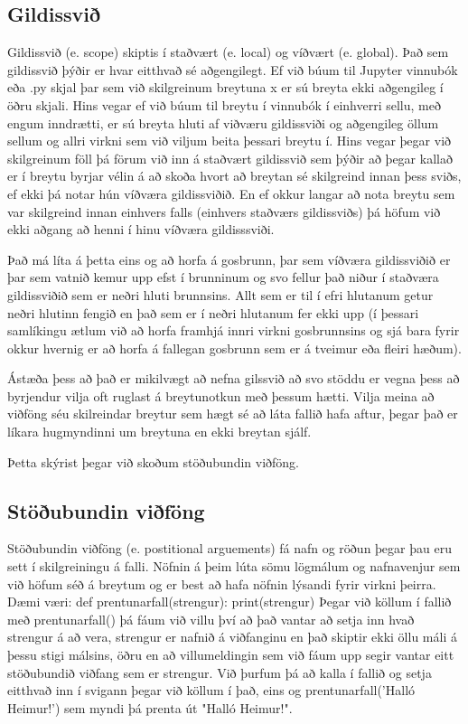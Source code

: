 \subsection{Gildissvið}\label{uk:gildissvið}
Gildissvið (e. scope) skiptis í staðvært (e. local) og víðvært (e. global). 
Það sem gildissvið þýðir er hvar eitthvað sé aðgengilegt.
Ef við búum til Jupyter vinnubók eða .py skjal þar sem við skilgreinum breytuna x er sú breyta ekki aðgengileg í öðru skjali.
Hins vegar ef við búum til breytu í vinnubók í einhverri sellu, með engum inndrætti, er sú breyta hluti af viðværu gildissviði og aðgengileg öllum sellum og allri virkni sem við viljum beita þessari breytu í.
Hins vegar þegar við skilgreinum föll þá förum við inn á staðvært gildissvið sem þýðir að þegar kallað er í breytu byrjar vélin á að skoða hvort að breytan sé skilgreind innan þess sviðs, ef ekki þá notar hún víðværa gildissviðið.
En ef okkur langar að nota breytu sem var skilgreind innan einhvers falls (einhvers staðværs gildissviðs) þá höfum við ekki aðgang að henni í hinu víðværa gildisssviði.

Það má líta á þetta eins og að horfa á gosbrunn, þar sem víðværa gildissviðið er þar sem vatnið kemur upp efst í brunninum og svo fellur það niður í staðværa gildissviðið sem er neðri hluti brunnsins.
Allt sem er til í efri hlutanum getur neðri hlutinn fengið en það sem er í neðri hlutanum fer ekki upp (í þessari samlíkingu ætlum við að horfa framhjá innri virkni gosbrunnsins og sjá bara fyrir okkur hvernig er að horfa á fallegan gosbrunn sem er á tveimur eða fleiri hæðum).

Ástæða þess að það er mikilvægt að nefna gilssvið að svo stöddu er vegna þess að byrjendur vilja oft ruglast á breytunotkun með þessum hætti.
Vilja meina að viðföng séu skilreindar breytur sem hægt sé að láta fallið hafa aftur, þegar það er líkara hugmyndinni um breytuna en ekki breytan sjálf.

Þetta skýrist þegar við skoðum stöðubundin viðföng.

\subsection{Stöðubundin viðföng}
Stöðubundin viðföng (e. postitional arguements) fá nafn og röðun þegar þau eru sett í skilgreiningu á falli.
Nöfnin á þeim lúta sömu lögmálum og nafnavenjur sem við höfum séð á breytum og er best að hafa nöfnin lýsandi fyrir virkni þeirra.
Dæmi væri:
\newline def prentunarfall(strengur): 
\newline \phantom{----}print(strengur)
\newline
Þegar við köllum í fallið með prentunarfall() þá fáum við villu því að það vantar að setja inn hvað strengur á að vera, strengur er nafnið á viðfanginu en það skiptir ekki öllu máli á þessu stigi málsins, öðru en að villumeldingin sem við fáum upp segir vantar eitt stöðubundið viðfang sem er strengur.
Við þurfum þá að kalla í fallið og setja eitthvað inn í svigann þegar við köllum í það, eins og prentunarfall('Halló Heimur!') sem myndi þá prenta út "Halló Heimur!".

